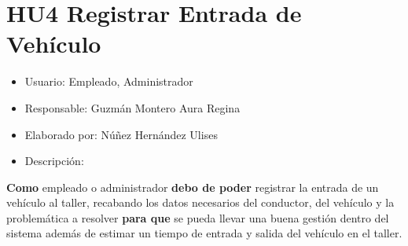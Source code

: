 \section{HU4 Registrar Entrada de Vehículo}
\begin{itemize}
	\item Usuario: Empleado, Administrador
	\item Responsable: Guzmán Montero Aura Regina
	\item Elaborado por: Núñez Hernández Ulises
	\item Descripción:\\
\end{itemize}

\textbf{Como} empleado o administrador \textbf{debo de poder} registrar la entrada de un vehículo al taller, recabando los datos necesarios del conductor, del vehículo y la problemática a resolver \textbf{para que} se pueda llevar una buena gestión dentro del sistema además de estimar un tiempo de entrada y salida del vehículo en el taller. 